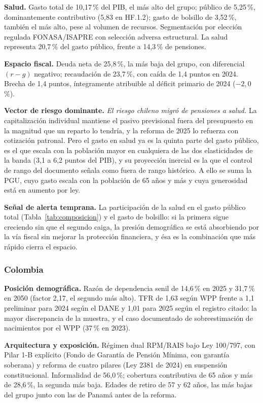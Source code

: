 \documentclass[12pt, letterpaper]{article}
\begin{document}
\textbf{Salud.} Gasto total de 10,17\,\% del PIB, el más alto del grupo; público
de 5,25\,\%, dominantemente contributivo (5,83 en HF.1.2); gasto de bolsillo de
3,52\,\%, también el más alto, pese al volumen de recursos. Segmentación por
elección regulada FONASA/ISAPRE con selección adversa estructural. La salud
representa 20,7\,\% del gasto público, frente a 14,3\,\% de pensiones.

\textbf{Espacio fiscal.} Deuda neta de 25,8\,\%, la más baja del grupo, con
diferencial $(r-g)$ negativo; recaudación de 23,7\,\%, con caída de 1,4 puntos en
2024. Brecha de 1,4 puntos, íntegramente atribuible al déficit primario de 2024
($-2{,}0$\,\%).

\textbf{Vector de riesgo dominante.} \emph{El riesgo chileno migró de pensiones a
salud.} La capitalización individual mantiene el pasivo previsional fuera del
presupuesto en la magnitud que un reparto lo tendría, y la reforma de 2025 lo
refuerza con cotización patronal. Pero el gasto en salud ya es la quinta parte del
gasto público, es el que escala con la población mayor en cualquiera de las dos
elasticidades de la banda (3,1 a 6,2 puntos del PIB), y su proyección inercial es la
que el control de rango del documento señala como fuera de rango histórico. A ello
se suma la PGU, cuyo gasto escala con la población de 65 años y más y cuya
generosidad está en aumento por ley.

\textbf{Señal de alerta temprana.} La participación de la salud en el gasto público
total (Tabla~\ref{tab:composicion}) y el gasto de bolsillo: si la primera sigue
creciendo sin que el segundo caiga, la presión demográfica se está absorbiendo por
la vía fiscal sin mejorar la protección financiera, y ésa es la combinación que
más rápido cierra el espacio.

\subsubsection{Colombia}

\textbf{Posición demográfica.} Razón de dependencia senil de 14,6\,\% en 2025 y
31,7\,\% en 2050 (factor 2,17, el segundo más alto). TFR de 1,63 según WPP frente a
1,1 preliminar para 2024 según el DANE y 1,01 para 2025 según el registro citado:
la mayor discrepancia de la muestra, y el caso documentado de sobreestimación de
nacimientos por el WPP (37\,\% en 2023).

\textbf{Arquitectura y exposición.} Régimen dual RPM/RAIS bajo Ley 100/797, con
Pilar 1-B explícito (Fondo de Garantía de Pensión Mínima, con garantía soberana) y
reforma de cuatro pilares (Ley 2381 de 2024) en suspensión constitucional.
Informalidad de 56,0\,\%; cobertura contributiva de 65 años y más de 28,6\,\%, la
segunda más baja. Edades de retiro de 57 y 62 años, las más bajas del grupo junto
con las de Panamá antes de la reforma.
\end{document}
